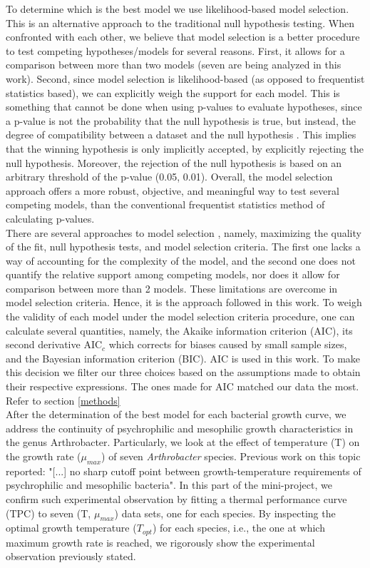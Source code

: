 \documentclass[titlepage,11pt]{article}
\begin{document}
\begin{linenumbers}
		To determine which is the best model we use likelihood-based model selection. This is an alternative approach to the traditional null hypothesis testing. When confronted with each other, we believe that model selection is a better procedure to test competing hypotheses/models for several reasons. First, it allows for a comparison between more than two models (seven are being analyzed in this work). Second, since model selection is likelihood-based (as opposed to frequentist statistics based), we can explicitly weigh the support for each model. This is something that cannot be done when using p-values to evaluate hypotheses, since a p-value is not the probability that the null hypothesis is true, but instead, the degree of compatibility between a dataset and the null hypothesis \cite{RonaldL.Wasserstein, Kim2016}. This implies that the winning hypothesis is only implicitly accepted, by explicitly rejecting the null hypothesis. Moreover, the rejection of the null hypothesis is based on an arbitrary threshold of the p-value (0.05, 0.01). Overall, the model selection approach offers a more robust, objective, and meaningful way to test several competing models, than the conventional frequentist statistics method of calculating p-values. \\
		There are several approaches to model selection \cite{Johnson2004}, namely,  maximizing the quality of the fit, null hypothesis tests, and model selection criteria. The first one lacks a way of accounting for the complexity of the model, and the second one does not quantify the relative support among competing models, nor does it allow for comparison between more than 2 models. These limitations are overcome in model selection criteria. Hence, it is the approach followed in this work.
		To weigh the validity of each model under the model selection criteria procedure, one can calculate several quantities, namely, the Akaike information criterion (AIC), its second derivative AIC$_c$ which corrects for biases caused by small sample sizes, and the Bayesian information criterion (BIC). AIC is used in this work. To make this decision we filter our three choices based on the assumptions made to obtain their respective expressions. The ones made for AIC matched our data the most. Refer to section \ref{methods} \\
		
		After the determination of the best model for each bacterial growth curve, we address the continuity of psychrophilic and mesophilic growth characteristics in the genus Arthrobacter. Particularly, we look at the effect of temperature (T) on the growth rate ($\mu_{max}$) of seven \textit{Arthrobacter} species. Previous work on this topic \cite{ROTH1962} reported: "[...] no sharp cutoff point between growth-temperature requirements of psychrophilic and mesophilic bacteria". In this part of the mini-project, we confirm such experimental observation by fitting a thermal performance curve (TPC) \cite{Lactin1995} to seven (T, $ \mu_{max} $) data sets, one for each species. By inspecting the optimal growth temperature ($ T_{opt} $) for each species, i.e., the one at which maximum growth rate is reached, we rigorously show the experimental observation previously stated.

\end{linenumbers}
\end{document}
